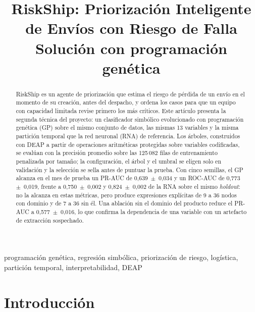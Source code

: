 \documentclass[conference]{IEEEtran}
\begin{document}
\title{RiskShip: Priorización Inteligente de Envíos con Riesgo de Falla\\
{\large Solución con programación genética}}

\author{
}

\maketitle

\begin{abstract}
RiskShip es un agente de priorización que estima el riesgo de pérdida de un
envío en el momento de su creación, antes del despacho, y ordena los casos para
que un equipo con capacidad limitada revise primero los más críticos. Este
artículo presenta la segunda técnica del proyecto: un clasificador simbólico
evolucionado con programación genética (GP) sobre el mismo conjunto de datos,
las mismas 13 variables y la misma partición temporal que la red neuronal
(RNA) de referencia. Los árboles, construidos con DEAP a partir de operaciones
aritméticas protegidas sobre variables codificadas, se evalúan con la precisión
promedio sobre las 125\,082 filas de entrenamiento penalizada por tamaño; la
configuración, el árbol y el umbral se eligen solo en validación y la selección
se sella antes de puntuar la prueba. Con cinco semillas, el GP alcanza en el mes
de prueba un PR-AUC de 0,639~$\pm$~0,034 y un ROC-AUC de 0,773~$\pm$~0,019,
frente a 0,750~$\pm$~0,002 y 0,824~$\pm$~0,002 de la RNA sobre el mismo
\textit{holdout}: no la alcanza en estas métricas, pero produce expresiones
explícitas de 9 a 36 nodos con dominio y de 7 a 36 sin él. Una ablación sin
el dominio del producto reduce el PR-AUC a
0,577~$\pm$~0,016, lo que confirma la dependencia de una variable con un
artefacto de extracción sospechado.
\end{abstract}

\begin{IEEEkeywords}
programación genética, regresión simbólica, priorización de riesgo, logística,
partición temporal, interpretabilidad, DEAP
\end{IEEEkeywords}

\section{Introducción}
\end{document}
